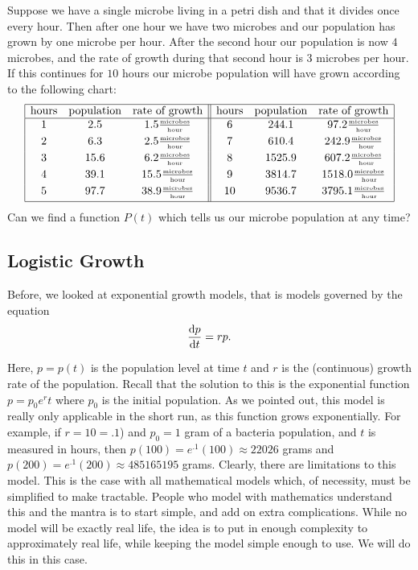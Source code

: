 Suppose we have a single microbe living in a petri dish and that it
divides once every hour. Then after one hour we have two microbes and
our population has grown by one microbe per hour. After the second
hour our population is now $4$ microbes, and the rate of growth during
that second hour is $3$ microbes per hour. If this continues for $10$
hours our microbe population will have grown according to the
following chart:
$$
\begin{array}{|ccc||ccc|}
\hline
  \text{hours}&\text{population}&\text{rate of
                                  growth}&\text{hours}&\text{population}&\text{rate
                                                                          of
                                                                          growth}\\\hline{}
  1&2.5&1.5\frac{\text{\tiny microbes}}{\text{\tiny hour}}&6&244.1&97.2\frac{\text{\tiny microbes}}{\text{\tiny hour}}\\[1mm]
  2&6.3&2.5\frac{\text{\tiny microbes}}{\text{\tiny hour}}&7&610.4&242.9\frac{\text{\tiny microbes}}{\text{\tiny hour}}\\[1mm]
  3&15.6&6.2\frac{\text{\tiny microbes}}{\text{\tiny hour}}&8&1525.9&607.2\frac{\text{\tiny microbes}}{\text{\tiny hour}}\\[1mm]
  4&39.1&15.5\frac{\text{\tiny microbes}}{\text{\tiny hour}}&9&3814.7&1518.0\frac{\text{\tiny microbes}}{\text{\tiny hour}}\\[1mm]
  5&97.7&38.9\frac{\text{\tiny microbes}}{\text{\tiny hour}}&10&9536.7&3795.1\frac{\text{\tiny microbes}}{\text{\tiny hour}}\\[1mm]\hline
\end{array}
$$
Can we find a function $P(t)$ which  tells us our microbe
population at any time?

\subsection{Logistic Growth}
Before, we looked at exponential growth models, that is models
governed by the equation
$$
\frac{\text{d}{p}}{\text{d}{t}}=rp.
$$


Here, $p=p(t)$ is the population level at time $t$ and $r$ is the
(continuous) growth rate of the population.  Recall that the solution
to this is the exponential function $p=p_0 e^rt$ where $p_0$ is the
initial population.  As we pointed out, this model is really only
applicable in the short run, as this function grows exponentially.
For example, if $r=10=.1$) and $p_0=1$ gram of a bacteria population,
and $t$ is measured in hours, then $p(100)=e^.1(100)\approx{}22026$ grams and
$p(200)=e^.1(200)\approx{}485165195$ grams.  Clearly, there are limitations to
this model.  This is the case with all mathematical models which, of
necessity, must be simplified to make tractable.  People who model
with mathematics understand this and the mantra is to start simple,
and add on extra complications.  While no model will be exactly real
life, the idea is to put in enough complexity to approximately real
life, while keeping the model simple enough to use.  We will do this
in this case.

